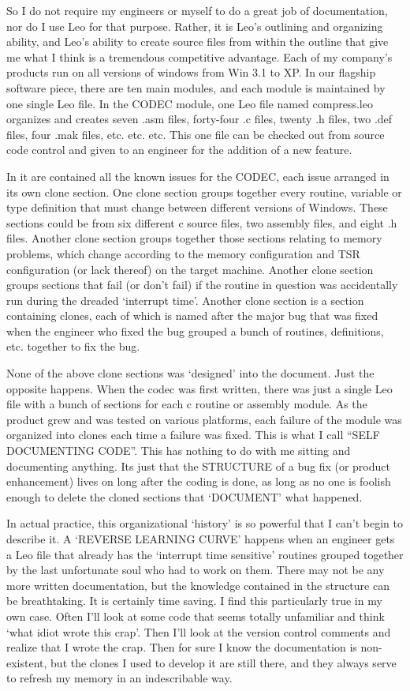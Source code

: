 \documentclass[a4paper,10pt,english]{sphinxmanual}
\begin{document}
So I do not require my engineers or myself to do a great job of documentation,
nor do I use Leo for that purpose. Rather, it is Leo’s outlining and organizing
ability, and Leo’s ability to create source files from within the outline that
give me what I think is a tremendous competitive advantage. Each of my company’s
products run on all versions of windows from Win 3.1 to XP. In our flagship
software piece, there are ten main modules, and each module is maintained by one
single Leo file. In the CODEC module, one Leo file named compress.leo organizes
and creates seven .asm files, forty-four .c files, twenty .h files, two .def
files, four .mak files, etc. etc. etc. This one file can be checked out from
source code control and given to an engineer for the addition of a new feature.

In it are contained all the known issues for the CODEC, each issue arranged in
its own clone section. One clone section groups together every routine, variable
or type definition that must change between different versions of Windows. These
sections could be from six different c source files, two assembly files, and
eight .h files. Another clone section groups together those sections relating to
memory problems, which change according to the memory configuration and TSR
configuration (or lack thereof) on the target machine. Another clone section
groups sections that fail (or don’t fail) if the routine in question was
accidentally run during the dreaded ‘interrupt time’. Another clone section is a
section containing clones, each of which is named after the major bug that was
fixed when the engineer who fixed the bug grouped a bunch of routines,
definitions, etc. together to fix the bug.

None of the above clone sections was ‘designed’ into the document. Just the
opposite happens. When the codec was first written, there was just a single Leo
file with a bunch of sections for each c routine or assembly module. As the
product grew and was tested on various platforms, each failure of the module was
organized into clones each time a failure was fixed. This is what I call “SELF
DOCUMENTING CODE”. This has nothing to do with me sitting and documenting
anything. Its just that the STRUCTURE of a bug fix (or product enhancement)
lives on long after the coding is done, as long as no one is foolish enough to
delete the cloned sections that ‘DOCUMENT’ what happened.

In actual practice, this organizational ‘history’ is so powerful that I can’t
begin to describe it. A ‘REVERSE LEARNING CURVE’ happens when an engineer gets a
Leo file that already has the ‘interrupt time sensitive’ routines grouped
together by the last unfortunate soul who had to work on them. There may not be
any more written documentation, but the knowledge contained in the structure can
be breathtaking. It is certainly time saving. I find this particularly true in
my own case. Often I’ll look at some code that seems totally unfamiliar and
think ‘what idiot wrote this crap’. Then I’ll look at the version control
comments and realize that I wrote the crap. Then for sure I know the
documentation is non-existent, but the clones I used to develop it are still
there, and they always serve to refresh my memory in an indescribable way.
\end{document}
